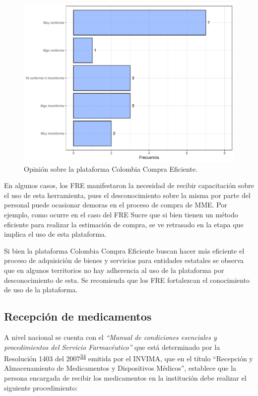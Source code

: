 \documentclass[
]{book}
\begin{document}
\begin{figure}[t]

{\centering \includegraphics[width=1\linewidth]{InformeFinal_files/figure-latex/ColombiaCompra-1} 

}

\caption{Opinión sobre la plataforma Colombia Compra Eficiente.}\label{fig:ColombiaCompra}
\end{figure}

En algunos casos, los FRE manifestaron la necesidad de recibir capacitación sobre el uso de esta herramienta, pues el desconocimiento sobre la misma por parte del personal puede ocasionar demoras en el proceso de compra de MME. Por ejemplo, como ocurre en el caso del FRE Sucre que si bien tienen un método eficiente para realizar la estimación de compra, se ve retrasado en la etapa que implica el uso de esta plataforma.

Si bien la plataforma Colombia Compra Eficiente buscan hacer más eficiente el proceso de adquisición de bienes y servicios para entidades estatales se observa que en algunos territorios no hay adherencia al uso de la plataforma por desconocimiento de esta. Se recomienda que los FRE fortalezcan el conocimiento de uso de la plataforma.

\hypertarget{recepciuxf3n-de-medicamentos}{%
\subsection{Recepción de medicamentos}\label{recepciuxf3n-de-medicamentos}}

A nivel nacional se cuenta con el \emph{``Manual de condiciones esenciales y procedimientos del Servicio Farmacéutico''} que está determinado por la Resolución 1403 del 2007\textsuperscript{\protect\hyperlink{ref-MinisteriodeSaludyProteccionSocial2007}{34}} emitida por el INVIMA, que en el título ``Recepción y Almacenamiento de Medicamentos y Dispositivos Médicos'', establece que la persona encargada de recibir los medicamentos en la institución debe realizar el siguiente procedimiento:
\end{document}
